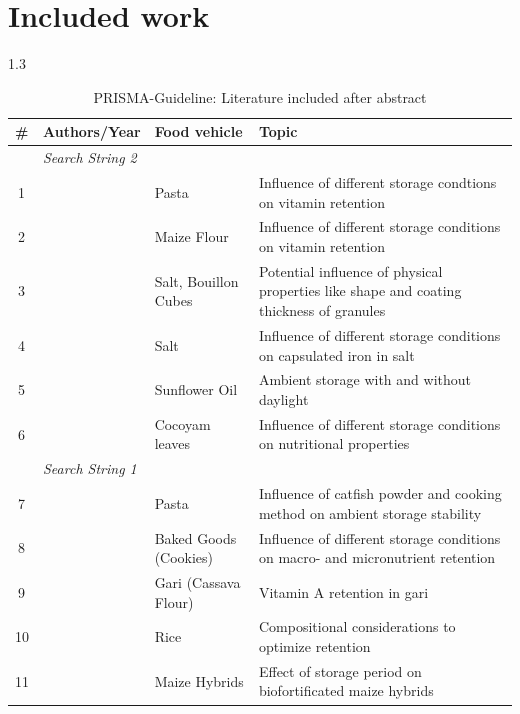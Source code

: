 \documentclass[a4paper,12pt]{article}
\begin{document}
\section{Included work}
\begin{table}[h]
\caption{PRISMA-Guideline: Literature included after abstract}
\begin{spacing}{1.3}
\footnotesize
\begin{tabular}{p{}p{} 
                   p{} 
                   p{} }
\toprule
\textbf{\#}&\textbf{Authors/Year} & \textbf{Food vehicle} & \textbf{Topic} \\ \midrule
&\multicolumn{3}{l}{\textit{Search String 2}} \\ \midrule
$~$1& \cite{sharma} & Pasta &  Influence of different storage condtions on vitamin retention \\
$~$2& \cite{chepkoech} & Maize Flour & Influence of different storage conditions on vitamin retention \\ 
$~$3& \cite{li2coatsalt} & Salt, Bouillon Cubes & Potential influence of physical properties like shape and coating thickness of granules \\ 
$~$4& \cite{li3capsalt} & Salt & Influence of different storage conditions on capsulated iron in salt \\ 
$~$5& \cite{li4daylight} & Sunflower Oil & Ambient storage with and without daylight \\ 
$~$6& \cite{li5cocoyam} & Cocoyam leaves & Influence of different storage conditions on nutritional properties \\
\midrule
&\multicolumn{3}{l}{\textit{Search String 1}} \\ \midrule
$~$7 & \cite{noodle} & Pasta & Influence of catfish powder and cooking method on ambient storage stability \\
$~$8 & \cite{cookie} & Baked Goods (Cookies) & Influence of different storage conditions on macro- and micronutrient retention \\
$~$9 & \cite{gari} & Gari (Cassava Flour) & Vitamin A retention in gari \\ 
10 & \cite{saha} & Rice & Compositional considerations to optimize retention \\
11 & \cite{dutta} & Maize Hybrids & Effect of storage period on biofortificated maize hybrids \\
\bottomrule
\end{tabular}

\end{spacing}
\end{table}
\end{document}
